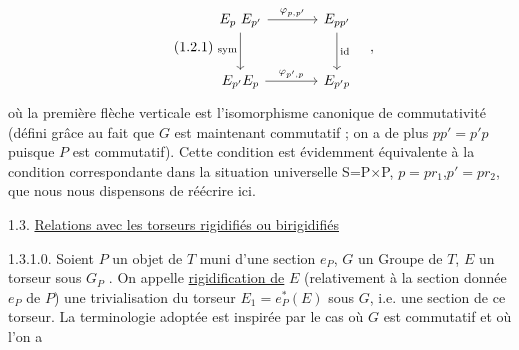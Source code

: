 \begin{equation}\tag{1.2.1}
\begin{tikzcd}[column sep=large, row sep=large]
E_p\ E_{p'} \arrow[r, "{\varphi_{p,p'}}"] \arrow[d, "\mathrm{sym}"'] & E_{pp'} \arrow[d, "\mathrm{id}"] \\
E_{p'}E_p \arrow[r, "{\varphi_{p',p}}"] & E_{p'p}
\end{tikzcd}\quad ,
\end{equation}
où la première flèche verticale est l'isomorphisme canonique de commutativité (défini grâce au fait que $G$ est maintenant commutatif ; on a de plus $pp' = p'p$ puisque $P$ est commutatif). Cette condition est évidemment équivalente à la condition correspondante dans la situation universelle S=P$\times$P, $p=pr_1$,$p' = pr_2$, que nous nous dispensons de réécrire ici.


1.3.  \underline{Relations avec les torseurs rigidifiés ou birigidifiés}

1.3.1.0.  Soient $P$ un objet de $T$ muni d'une section $e_P$, $G$ un Groupe de \underline{$T$}, $E$ un torseur sous $G_P$ . On appelle \underline{rigidification de} $E$ (relativement à la section donnée $e_P$ de $P$) une trivialisation du torseur $E_1 = e_P^*(E)$ sous $G$,
i.e. une section de ce torseur. La terminologie adoptée est inspirée par le cas où $G$ est commutatif et où l'on a

